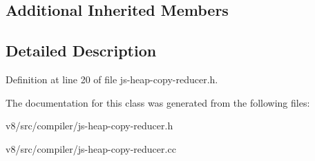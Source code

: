 \subsection*{Additional Inherited Members}


\subsection{Detailed Description}


Definition at line 20 of file js-\/heap-\/copy-\/reducer.\+h.



The documentation for this class was generated from the following files\+:\begin{DoxyCompactItemize}
\item 
v8/src/compiler/js-\/heap-\/copy-\/reducer.\+h\item 
v8/src/compiler/js-\/heap-\/copy-\/reducer.\+cc\end{DoxyCompactItemize}
